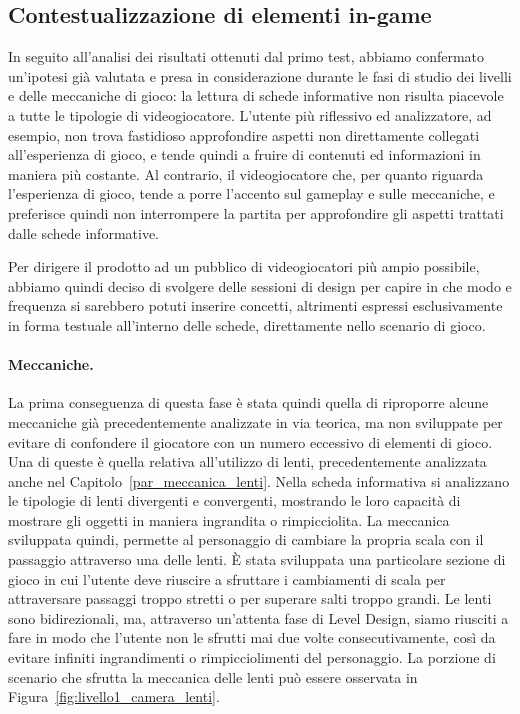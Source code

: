 \subsection{Contestualizzazione di elementi in-game}
\label{sec:contestualizzazione_elementi}

In seguito all’analisi dei risultati ottenuti dal primo test, abbiamo confermato un’ipotesi già valutata e presa in considerazione durante le fasi di studio dei livelli e delle meccaniche di gioco: la lettura di schede informative non risulta piacevole a tutte le tipologie di videogiocatore.
L’utente più riflessivo ed analizzatore, ad esempio, non trova fastidioso approfondire aspetti non direttamente collegati all’esperienza di gioco, e tende quindi a fruire di contenuti ed informazioni in maniera più costante.
Al contrario, il videogiocatore che, per quanto riguarda l’esperienza di gioco, tende a porre l’accento sul gameplay e sulle meccaniche, e preferisce quindi non interrompere la partita per approfondire gli aspetti trattati dalle schede informative.

Per dirigere il prodotto ad un pubblico di videogiocatori più ampio possibile, abbiamo quindi deciso di svolgere delle sessioni di design per capire in che modo e frequenza si sarebbero potuti inserire concetti, altrimenti espressi esclusivamente in forma testuale all’interno delle schede, direttamente nello scenario di gioco.

\paragraph{Meccaniche.}

La prima conseguenza di questa fase è stata quindi quella di riproporre alcune meccaniche già precedentemente analizzate in via teorica, ma non sviluppate per evitare di confondere il giocatore con un numero eccessivo di elementi di gioco.
Una di queste è quella relativa all’utilizzo di lenti, precedentemente analizzata anche nel Capitolo~\ref{par_meccanica_lenti}. Nella scheda informativa si analizzano le tipologie di lenti divergenti e convergenti, mostrando le loro capacità di mostrare gli oggetti in maniera ingrandita o rimpicciolita.
La meccanica sviluppata quindi, permette al personaggio di cambiare la propria scala con il passaggio attraverso una delle lenti. È stata sviluppata una particolare sezione di gioco in cui l’utente deve riuscire a sfruttare i cambiamenti di scala per attraversare passaggi troppo stretti o per superare salti troppo grandi.
Le lenti sono bidirezionali, ma, attraverso un’attenta fase di Level Design, siamo riusciti a fare in modo che l’utente non le sfrutti mai due volte consecutivamente, così da evitare infiniti ingrandimenti o rimpicciolimenti del personaggio.
La porzione di scenario che sfrutta la meccanica delle lenti può essere osservata in Figura~\ref{fig:livello1_camera_lenti}.

